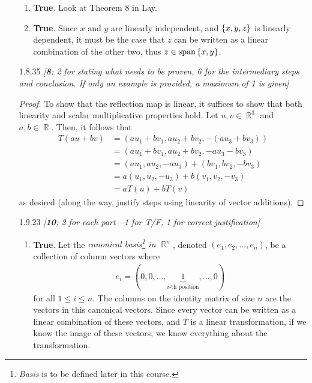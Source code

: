 \documentclass{amsart}
\theoremstyle{definition}
\theoremstyle{definition}
\DeclareMathOperator{\R}{\mathbb{R}}
\DeclareMathOperator{\1}{\mathbbm{1}}
\DeclareMathOperator{\Span}{span}
\renewcommand{\leq}{\leqslant}
\begin{document}
\begin{enumerate}[itemsep = 2mm]
\begin{enumerate}
		\item \textbf{True}. Look at Theorem 8 in Lay.
		
		
		\item \textbf{True}. Since $x$ and $y$ are linearly independent, and $\set{x,y,z}$ is linearly dependent, it must be the case that $z$ can be written as a linear combination of the other two, thus $z \in \Span \set{x,y}$.
	\end{enumerate}
	
	
	
	\item[1.8.35] \textit{[\textbf{8}; 2 for stating what needs to be proven, 6 for the intermediary steps and conclusion. If only an example is provided, a maximum of 1 is given]}
	
	\begin{proof}
		To show that the reflection map is linear, it suffices to show that both linearity and scalar multiplicative properties hold. Let $u,v \in \R^3$ and $a,b \in \R$. Then, it follows that
		\begin{align*}
		T(au + bv) &= (a u_1 + b v_1, a u_2 + b v_2, - (a u_3 + b v_3) ) \\
		&= (a u_1 + b v_1, a u_2 + b v_2, - a u_3 - b v_3) \\
		&= (a u_1, a u_2, - a u_3) + (b v_1, b v_2, - b v_3) \\
		&= a (u_1, u_2, - u_3) + b (v_1, v_2, -v_3) \\
		&= a T(u) + b T(v)
		\end{align*}
		as desired (along the way, justify steps using linearity of vector additions).
	\end{proof}
	
	
	
	\item[1.9.23] \textit{[\textbf{10}; 2 for each part---1 for T/F, 1 for correct justification]}
	
	\begin{enumerate}
		\item \textbf{True}. Let the \textit{canonical basis\footnote{\textit{Basis} is to be defined later in this course.} in $\R^n$}, denoted $(e_1,e_2,\dots,e_n)$, be a collection of column vectors where
		\begin{align*}
		e_i = (0,0,\dots,\underbrace{1}_{i\text{-th position}},\dots, 0)
		\end{align*}
		for all $1 \leq i \leq n$. The columns on the identity matrix of size $n$ are the vectors in this canonical vectors. Since every vector can be written as a linear combination of these vectors, and $T$ is a linear transformation, if we know the image of these vectors, we know everything about the transformation.
		

\end{enumerate}
\end{enumerate}
\end{document}
